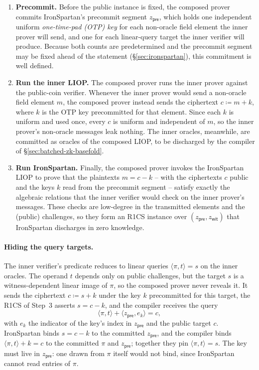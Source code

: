\documentclass{article}
\theoremstyle{definition}
\begin{document}
\begin{enumerate}
\item \textbf{Precommit.} Before the public instance is fixed, the composed prover commits IronSpartan's precommit segment $z_{\textsf{pre}}$, which holds one independent uniform \emph{one-time-pad (OTP) key} for each non-oracle field element the inner prover will send, and one for each linear-query target the inner verifier will produce. Because both counts are predetermined and the precommit segment may be fixed ahead of the statement (\S\ref{sec:ironspartan}), this commitment is well defined.

\item \textbf{Run the inner LIOP.} The composed prover runs the inner prover against the public-coin verifier. Whenever the inner prover would send a non-oracle field element $m$, the composed prover instead sends the ciphertext $c \coloneqq m + k$, where $k$ is the OTP key precommitted for that element. Since each $k$ is uniform and used once, every $c$ is uniform and independent of $m$, so the inner prover's non-oracle messages leak nothing. The inner oracles, meanwhile, are committed as oracles of the composed LIOP, to be discharged by the compiler of \S\ref{sec:batched-zk-basefold}.

\item \textbf{Run IronSpartan.} Finally, the composed prover invokes the IronSpartan LIOP to prove that the plaintexts $m = c - k$ -- with the ciphertexts $c$ public and the keys $k$ read from the precommit segment -- satisfy exactly the algebraic relations that the inner verifier would check on the inner prover's messages. These checks are low-degree in the transmitted elements and the (public) challenges, so they form an R1CS instance over $(z_{\textsf{pre}}, z_{\textsf{wit}})$ that IronSpartan discharges in zero knowledge.
\end{enumerate}

\paragraph{Hiding the query targets.}
The inner verifier's predicate reduces to linear queries $\langle \pi, t \rangle = s$ on the inner oracles. The operand $t$ depends only on public challenges, but the target $s$ is a witness-dependent linear image of $\pi$, so the composed prover never reveals it. It sends the ciphertext $c \coloneqq s + k$ under the key $k$ precommitted for this target, the R1CS of Step~3 asserts $s = c - k$, and the compiler receives the query
\begin{equation}
  \langle \pi, t \rangle + \langle z_{\textsf{pre}}, e_k \rangle = c,
  \label{eq:target-relation}
\end{equation}
with $e_k$ the indicator of the key's index in $z_{\textsf{pre}}$ and the public target $c$. IronSpartan binds $s = c - k$ to the committed $z_{\textsf{pre}}$, and the compiler binds $\langle \pi, t \rangle + k = c$ to the committed $\pi$ and $z_{\textsf{pre}}$; together they pin $\langle \pi, t \rangle = s$. The key must live in $z_{\textsf{pre}}$: one drawn from $\pi$ itself would not bind, since IronSpartan cannot read entries of $\pi$.
\end{document}
